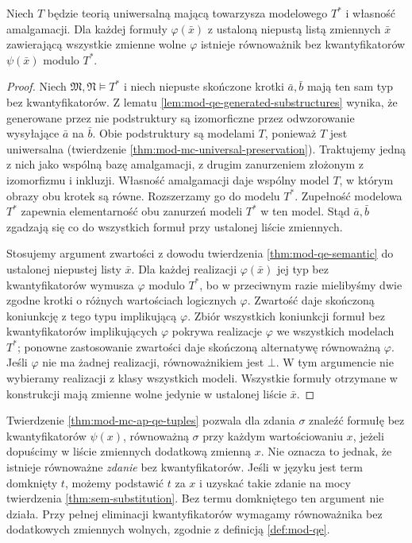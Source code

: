 \begin{twierdzenie}
\label{thm:mod-mc-ap-qe-tuples}
Niech $T$ będzie teorią uniwersalną mającą towarzysza
modelowego $T^*$ i własność amalgamacji.
Dla każdej formuły $\varphi(\bar x)$ z ustaloną
niepustą listą zmiennych $\bar x$ zawierającą wszystkie
zmienne wolne $\varphi$ istnieje równoważnik bez
kwantyfikatorów $\psi(\bar x)$ modulo $T^*$.
\end{twierdzenie}
\begin{proof}
Niech $\mathfrak M,\mathfrak N\models T^*$ i niech
niepuste skończone krotki $\bar a,\bar b$ mają ten
sam typ bez kwantyfikatorów. Z lematu
\ref{lem:mod-qe-generated-substructures} wynika,
że generowane przez nie podstruktury są izomorficzne
przez odwzorowanie wysyłające $\bar a$ na $\bar b$.
Obie podstruktury są modelami $T$, ponieważ $T$
jest uniwersalna (twierdzenie
\ref{thm:mod-mc-universal-preservation}).
Traktujemy jedną z nich jako wspólną bazę amalgamacji,
z drugim zanurzeniem złożonym z izomorfizmu i inkluzji.
Własność amalgamacji daje wspólny model $T$,
w którym obrazy obu krotek są równe.
Rozszerzamy go do modelu $T^*$.
Zupełność modelowa $T^*$ zapewnia elementarność
obu zanurzeń modeli $T^*$ w ten model.
Stąd $\bar a,\bar b$ zgadzają się co do wszystkich
formuł przy ustalonej liście zmiennych.

Stosujemy argument zwartości z dowodu twierdzenia
\ref{thm:mod-qe-semantic} do ustalonej niepustej
listy $\bar x$. Dla każdej realizacji $\varphi(\bar x)$
jej typ bez kwantyfikatorów wymusza $\varphi$ modulo $T^*$,
bo w przeciwnym razie mielibyśmy dwie zgodne krotki
o różnych wartościach logicznych $\varphi$.
Zwartość daje skończoną koniunkcję z tego typu
implikującą $\varphi$. Zbiór wszystkich koniunkcji
formuł bez kwantyfikatorów implikujących $\varphi$
pokrywa realizacje $\varphi$ we wszystkich modelach
$T^*$; ponowne zastosowanie zwartości daje skończoną
alternatywę równoważną $\varphi$.
Jeśli $\varphi$ nie ma żadnej realizacji, równoważnikiem
jest $\bot$. W tym argumencie nie wybieramy realizacji
z klasy wszystkich modeli.
Wszystkie formuły otrzymane w konstrukcji mają
zmienne wolne jedynie w ustalonej liście $\bar x$.
\end{proof}

\begin{uwaga}
\label{rem:mod-mc-dummy-variable}
Twierdzenie \ref{thm:mod-mc-ap-qe-tuples} pozwala
dla zdania $\sigma$ znaleźć formułę bez kwantyfikatorów
$\psi(x)$, równoważną $\sigma$ przy każdym wartościowaniu
$x$, jeżeli dopuścimy w liście zmiennych dodatkową
zmienną $x$. Nie oznacza to jednak, że istnieje
równoważne \emph{zdanie} bez kwantyfikatorów.
Jeśli w języku jest term domknięty $t$, możemy
podstawić $t$ za $x$ i uzyskać takie zdanie
na mocy twierdzenia \ref{thm:sem-substitution}.
Bez termu domkniętego ten argument nie działa.
Przy pełnej eliminacji kwantyfikatorów wymagamy
równoważnika bez dodatkowych zmiennych wolnych,
zgodnie z definicją \ref{def:mod-qe}.
\end{uwaga}

